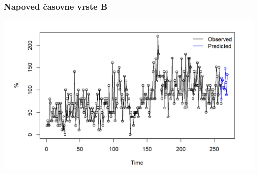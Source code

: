\documentclass[10pt]{beamer}
\begin{document}
\begin{frame}
\frametitle{Napoved časovne vrste B}
\includegraphics[width=1\textwidth]{napovedB.png}
\end{frame}
\end{document}
